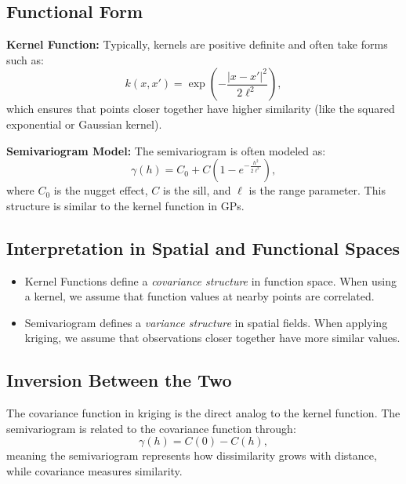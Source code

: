 \documentclass{article}
\begin{document}
\subsection{Functional Form}
\textbf{Kernel Function:} Typically, kernels are positive definite and often take forms such as:
\begin{equation}
    k(x, x') = \exp \left( -\frac{|x - x'|^2}{2\ell^2} \right),
\end{equation}
which ensures that points closer together have higher similarity (like the squared exponential or Gaussian kernel).

\textbf{Semivariogram Model:} The semivariogram is often modeled as:
\begin{equation}
    \gamma(h) = C_0 + C \left( 1 - e^{-\frac{h^2}{2\ell^2}} \right),
\end{equation}
where \( C_0 \) is the nugget effect, \( C \) is the sill, and \( \ell \) is the range parameter. This structure is similar to the kernel function in GPs.

\subsection{Interpretation in Spatial and Functional Spaces}
\begin{itemize}
    \item Kernel Functions define a \textit{covariance structure} in function space. When using a kernel, we assume that function values at nearby points are correlated.
    \item Semivariogram defines a \textit{variance structure} in spatial fields. When applying kriging, we assume that observations closer together have more similar values.
\end{itemize}

\subsection{Inversion Between the Two}
The covariance function in kriging is the direct analog to the kernel function. The semivariogram is related to the covariance function through:
\begin{equation}
    \gamma(h) = C(0) - C(h),
\end{equation}
meaning the semivariogram represents how dissimilarity grows with distance, while covariance measures similarity.
\end{document}
